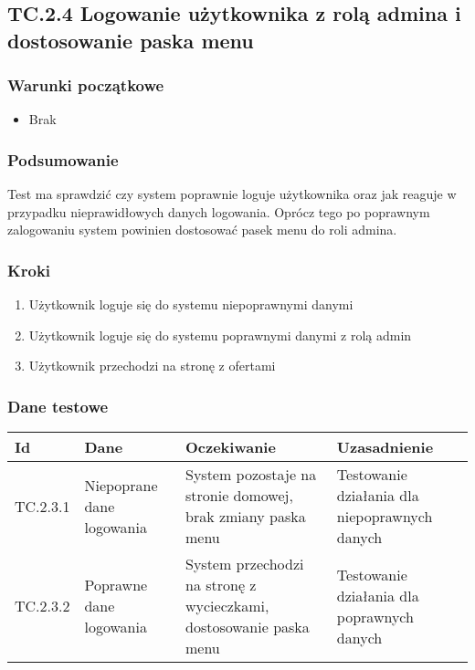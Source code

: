 \documentclass[a4paper,15pt]{article}
\begin{document}
\newpage
\begin{framed}
\subsection{TC.2.4 Logowanie użytkownika z rolą admina i dostosowanie paska menu}


\vspace{0.5cm}

\subsubsection{Warunki początkowe}
\begin{itemize}
\item Brak
\end{itemize}

\subsubsection{Podsumowanie}
Test ma sprawdzić czy system poprawnie loguje użytkownika oraz jak reaguje w przypadku nieprawidłowych danych logowania. Oprócz tego po poprawnym zalogowaniu system powinien dostosować pasek menu do roli admina. 

\subsubsection{Kroki}
\begin{enumerate}
\item Użytkownik loguje się do systemu niepoprawnymi danymi
\item Użytkownik loguje się do systemu poprawnymi danymi z rolą admin
\item Użytkownik przechodzi na stronę z ofertami
\end{enumerate}

\subsubsection{Dane testowe}

\begin{center}
\begin{tabular}{ |C{1.5cm}|C{3cm}|C{4cm}|C{4cm}| } 
 \hline
 \textbf{Id} & \textbf{Dane} & \textbf{Oczekiwanie} & \textbf{Uzasadnienie} \\ \hline
 TC.2.3.1 & Niepoprane dane logowania & System pozostaje na stronie domowej, brak zmiany paska menu & Testowanie działania dla niepoprawnych danych \\ \hline
 TC.2.3.2 & Poprawne dane logowania & System przechodzi na stronę z wycieczkami, dostosowanie paska menu & Testowanie działania dla poprawnych danych \\ \hline
\end{tabular}
\end{center}

\end{framed}
\end{document}

